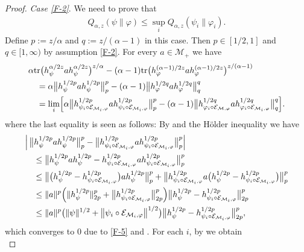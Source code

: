 \documentclass[11pt,reqno]{article}
\numberwithin{equation}{section}
\def\cM{\mathcal{M}}
\def\ffi{\varphi}
\def\tr{\mathrm{tr}}
\def\cE{\mathcal{E}}
\begin{document}
\begin{proof}
{\it Case \eqref{F-2}}.\enspace
We need to prove that
\begin{align}\label{F-11}
Q_{\alpha,z}(\psi\|\ffi)\le\sup_iQ_{\alpha,z}(\psi_i\|\ffi_i).
\end{align}
Define $p:=z/\alpha$ and $q:=z/(\alpha-1)$ in this case. Then $p\in[1/2,1]$ and $q\in[1,\infty)$ by assumption
\eqref{F-2}. For every $a\in\cM_+$ we have
\begin{equation}\label{F-12}
\begin{aligned}
&\alpha\tr\bigl(h_\psi^{\alpha/2z}ah_\psi^{\alpha/2z}\bigr)^{z/\alpha}
-(\alpha-1)\tr\bigl(h_\ffi^{(\alpha-1)/2z}ah_\ffi^{(\alpha-1)/2z}\bigr)^{z/(\alpha-1)} \\
&\quad=\alpha\big\|h_\psi^{1/2p}ah_\psi^{1/2p}\big\|_p^p
-(\alpha-1)\big\|h_\ffi^{1/2q}ah_\ffi^{1/2q}\big\|_q^q \\
&\quad=\lim_i\Bigl[\alpha\big\|h_{\psi_i\circ\cE_{\cM_i,\ffi}}^{1/2p}ah_{\psi_i\circ\cE_{\cM_i,\ffi}}^{1/2p}\big\|_p^p
-(\alpha-1)\big\|h_{\ffi_i\circ\cE_{\cM,\ffi}}^{1/2q}ah_{\ffi_i\circ\cE_{\cM_i,\ffi}}^{1/2q}\big\|_q^q\Bigr].
\end{aligned}
\end{equation}
where the last equality is seen as follows:  By \cite[Theorem 4.9(iii)]{FK} and the H\"older inequality we have
\begin{align*}
&\Big|\,\big\|h_\psi^{1/2p}ah_\psi^{1/2p}\big\|_p^p
-\big\|h_{\psi_i\circ\cE_{\cM_i,\ffi}}^{1/2p}ah_{\psi_i\circ\cE_{\cM_i,\ffi}}^{1/2p}\big\|_p^p\Big| \\
&\quad\le\big\|h_\psi^{1/2p}ah_\psi^{1/2p}
-h_{\psi_i\circ\cE_{\cM_i,\ffi}}^{1/2p}ah_{\psi_i\circ\cE_{\cM_i,\ffi}}^{1/2p}\big\|_p^p \\
&\quad\le\big\|\bigl(h_\psi^{1/2p}-h_{\psi_i\circ\cE_{\cM_i,\ffi}}^{1/2p}\bigr)ah_\psi^{1/2p}\big\|_p^p
+\big\|h_{\psi_i\circ\cE_{\cM_i,\ffi}}^{1/2p}a\bigl(h_\psi^{1/2p}-h_{\psi_i\circ\cE_{\cM_i,\ffi}}^{1/2p}\bigr)\big\|_p^p \\
&\quad\le\|a\|^p\Bigl(\|h_\psi^{1/2p}\|_{2p}^p+\big\|h_{\psi_i\circ\cE_{\cM_i,\ffi}}^{1/2p}\big\|_{2p}^p\Bigr)
\big\|h_\psi^{1/2p}-h_{\psi_i\circ\cE_{\cM_i,\ffi}}^{1/2p}\big\|_{2p}^p \\
&\quad\le\|a\|^p\bigl(\|\psi\|^{1/2}+\big\|\psi_i\circ\cE_{\cM_i,\ffi}\big\|^{1/2}\bigr)
\big\|h_\psi^{1/2p}-h_{\psi_i\circ\cE_{\cM_i,\ffi}}^{1/2p}\big\|_{2p}^p,
\end{align*}
which converges to $0$ due to \eqref{F-5} and \cite[Lemma 6]{K}. For each $i$, by \cite[(22)]{K} we obtain
\begin{equation}\label{F-13}

\end{equation}
\end{proof}
\end{document}
